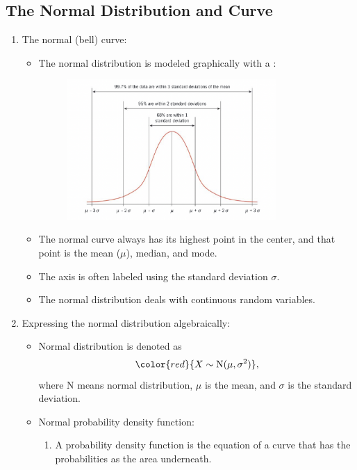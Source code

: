 \documentclass[12pt, a4paper]{article}
\begin{document}
\subsection{The Normal Distribution and Curve}
\begin{enumerate}
    \item The normal (bell) curve: 
    \begin{itemize}
        \item The normal distribution is modeled graphically with a \textbf{\color{red}{normal curve}}: 
        \begin{figure}[H]
            \center
            \includegraphics[width=0.8\textwidth]{Fig.4.6.jpg}
        \end{figure}
        \item The normal curve always has its highest point in the center, and that point is the mean ($\mu$), median, and mode. 
        \item The axis is often labeled using the standard deviation $\sigma$.
        \item The normal distribution deals with continuous random variables. 
    \end{itemize}
    \item Expressing the normal distribution algebraically: 
    \begin{itemize}
        \item Normal distribution is denoted as $${\color{red}{X\sim\mathrm{N}(\mu,\sigma^2)}},$$ where $\mathrm{N}$ means normal distribution, $\mu$ is the mean, and $\sigma$ is the standard deviation. 
        \item Normal probability density function: 
        \begin{enumerate}
            \item A probability density function is the equation of a curve that has the probabilities as the area underneath. 

\end{enumerate}
\end{itemize}
\end{enumerate}
\end{document}
